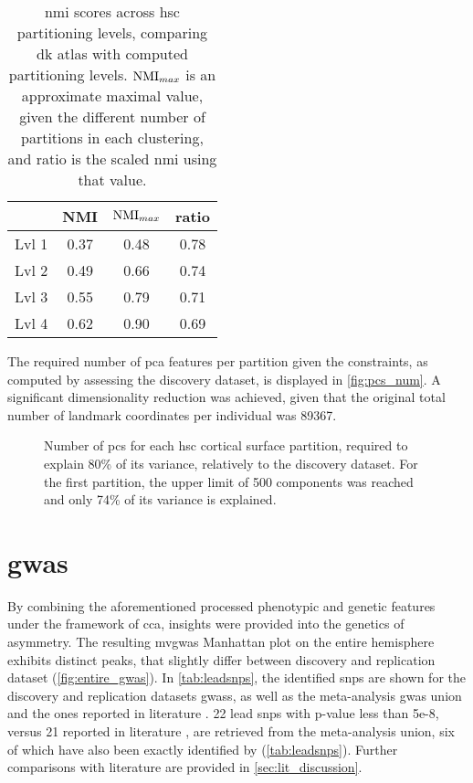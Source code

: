 \begin{table}[H]
	\centering
	\begin{tabular}{l|ccc}
		& NMI & $\operatorname*{NMI}_{max}$ & ratio\\
		\hline
		 Lvl 1 & 0.37 & 0.48 & 0.78\\
		 Lvl 2 & 0.49 & 0.66 & 0.74\\
		 Lvl 3 & 0.55 & 0.79 & 0.71\\
		 Lvl 4 & 0.62 & 0.90 & 0.69\\
	\end{tabular}
\caption [\Ac{nmi} scores across \ac{hsc} partitioning levels]{\Ac{nmi} scores across \ac{hsc} partitioning levels, comparing \ac{dk} atlas with computed partitioning levels. $\operatorname*{NMI}_{max}$ is an approximate maximal value, given the different number of partitions in each clustering, and ratio is the scaled \ac{nmi} using that value.}
\label{tab:nmi}
\end{table}
The required number of \ac{pca} features per partition given the constraints, as computed by assessing the discovery dataset, is displayed in \autoref{fig:pcs_num}. A significant dimensionality reduction was achieved, given that the original total number of landmark coordinates per individual was 89367.
\begin{figure}[H]

\caption[Number of PCs per HSC cortical surface partition]{Number of \acp{pc} for each \ac{hsc} cortical surface partition, required to explain 80\% of its variance, relatively to the discovery dataset. For the first partition, the upper limit of 500 components was reached and only 74\% of its variance is explained.}
\label{fig:pcs_num}
\end{figure}
\section{\acs{gwas}}
By combining the aforementioned processed phenotypic and genetic features under the framework of \ac{cca}, insights were provided into the genetics of asymmetry. The resulting \ac{mvgwas} Manhattan plot on the entire hemisphere exhibits distinct peaks, that slightly differ between discovery and replication dataset (\autoref{fig:entire_gwas}). In \autoref{tab:leadsnps}, the identified \acp{snp} are shown for the discovery and replication datasets \acp{gwas}, as well as the meta-analysis \ac{gwas} union and the ones reported in literature \cite{Sha2021}. 22 lead \acp{snp} with p-value less than 5e-8, versus 21 reported in literature \cite{Sha2021}, are retrieved from the meta-analysis union, six of which have also been exactly identified by \citet{Sha2021} (\autoref{tab:leadsnps}). Further comparisons with literature are provided in \autoref{sec:lit_discussion}.

